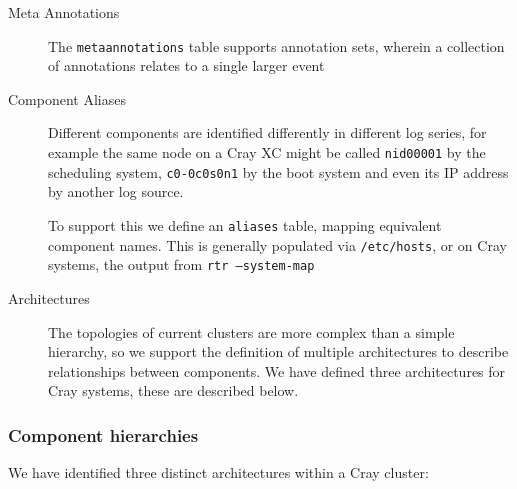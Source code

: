 \begin{description}
\item[Meta Annotations] \hfill

      The \texttt{metaannotations} table supports annotation sets,
      wherein a collection of annotations relates to a single larger
      event
      
\item[Component Aliases] \hfill

      Different components are identified differently in different log 
      series, for example the same node on a Cray XC might be called
      \texttt{nid00001} by the scheduling system, \texttt{c0-0c0s0n1}
      by the boot system and even its IP address by another log source.
      
      To support this we define an \texttt{aliases} table, mapping 
      equivalent component names. This is generally populated via
      \texttt{/etc/hosts}, or on Cray systems, the output from
      \texttt{rtr --system-map}
      
\item[Architectures] \hfill

      The topologies of current clusters are more complex than
      a simple hierarchy, so we support the definition of multiple
      architectures to describe relationships between components.
      We have defined three architectures for Cray systems, these
      are described below. 
      
\end{description}

\subsubsection{Component hierarchies}
\label{s:hierarchies}

We have identified three distinct architectures within a Cray cluster:

